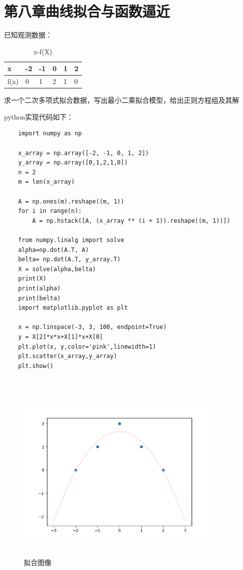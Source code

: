 \documentclass[UTF8]{ctexart}
\begin{document}
\newpage

\section{第八章曲线拟合与函数逼近}


已知观测数据：

\begin{table}[H]
\centering
\caption{x-f(X)}
\begin{tabular}{|l|l|l|l|l|l|}
\hline

x & -2 & -1 & 0 & 1 & 2 \\ \hline
f(x) & 0  & 1 & 2 & 1 & 0 \\ \hline

\end{tabular}
\end{table}

求一个二次多项式拟合数据，写出最小二乘拟合模型，给出正则方程组及其解



python实现代码如下：
\begin{lstlisting}	
	import numpy as np

	x_array = np.array([-2, -1, 0, 1, 2])
	y_array = np.array([0,1,2,1,0])
	n = 2
	m = len(x_array)  

	A = np.ones(m).reshape((m, 1))
	for i in range(n):
	    A = np.hstack([A, (x_array ** (i + 1)).reshape((m, 1))])

	from numpy.linalg import solve
	alpha=np.dot(A.T, A)
	belta= np.dot(A.T, y_array.T)
	X = solve(alpha,belta)
	print(X)
	print(alpha)
	print(belta)
	import matplotlib.pyplot as plt

	x = np.linspace(-3, 3, 100, endpoint=True)
	y = X[2]*x*x+X[1]*x+X[0]
	plt.plot(x, y,color='pink',linewidth=1)
	plt.scatter(x_array,y_array)
	plt.show()


\end{lstlisting}

\begin{figure}[H]
 \centering
  \includegraphics[width=10cm,height=9cm]{8.png}
  \caption{拟合图像}
\end{figure}
\end{document}
